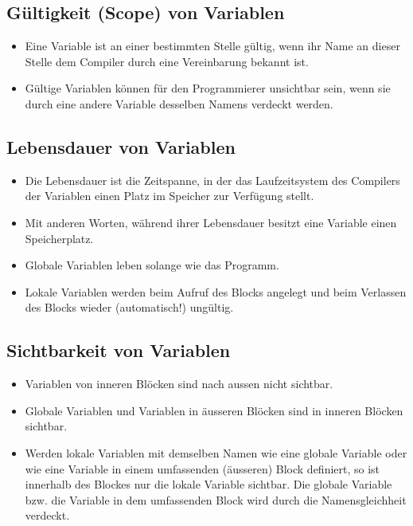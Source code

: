 \subsection{Gültigkeit (Scope) von Variablen}
\begin{itemize}
	\item Eine Variable ist an einer bestimmten Stelle gültig, wenn ihr Name an dieser Stelle dem Compiler durch eine Vereinbarung bekannt ist.
	\item Gültige Variablen können für den Programmierer unsichtbar sein, wenn sie durch eine andere Variable desselben Namens verdeckt werden.
\end{itemize}

\subsection{Lebensdauer von Variablen}
\begin{itemize}
	\item Die Lebensdauer ist die Zeitspanne, in der das Laufzeitsystem des Compilers der Variablen einen Platz im Speicher zur Verfügung stellt.
	\item Mit anderen Worten, während ihrer Lebensdauer besitzt eine Variable einen Speicherplatz.
	\item Globale Variablen leben solange wie das Programm.
	\item Lokale Variablen werden beim Aufruf des Blocks angelegt und beim Verlassen des Blocks wieder (automatisch!) ungültig.
\end{itemize}

\subsection{Sichtbarkeit von Variablen}
\begin{itemize}
	\item Variablen von inneren Blöcken sind nach aussen nicht sichtbar.
	\item Globale Variablen und Variablen in äusseren Blöcken sind in inneren Blöcken sichtbar.
	\item Werden lokale Variablen mit demselben Namen wie eine globale Variable oder wie eine Variable in einem umfassenden (äusseren) Block definiert, so ist innerhalb des Blockes nur die lokale Variable sichtbar. Die globale Variable bzw. die Variable in dem umfassenden Block wird durch die Namensgleichheit verdeckt.
\end{itemize}

